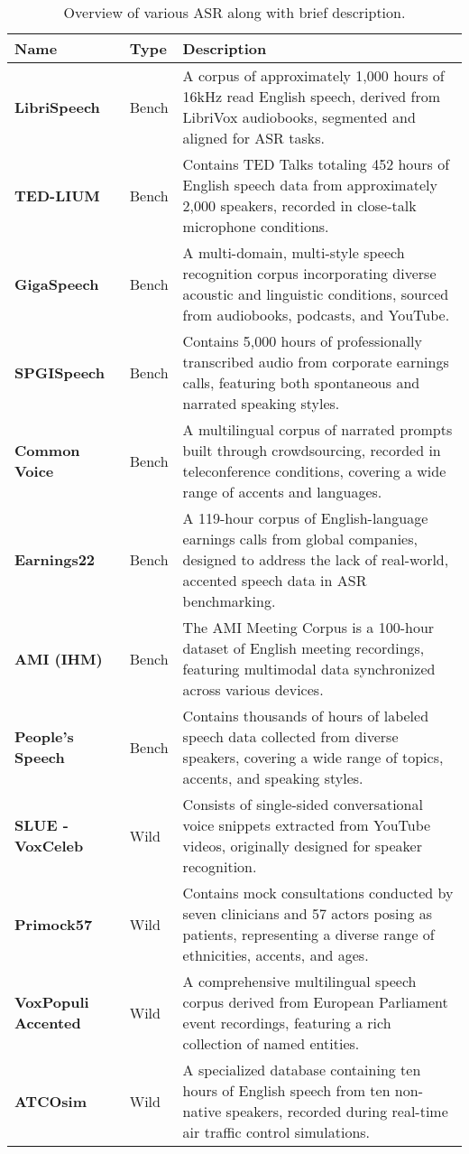 \begin{table*}[h!]
\centering
\begin{tabular}{p{4cm}p{2cm}p{8cm}}
\toprule
\textbf{Name} & \textbf{Type} & \textbf{Description} \\ \midrule
\textbf{LibriSpeech} & Bench & A corpus of approximately 1,000 hours of 16kHz read English speech, derived from LibriVox audiobooks, segmented and aligned for ASR tasks. \\
\textbf{TED-LIUM} & Bench & Contains TED Talks totaling 452 hours of English speech data from approximately 2,000 speakers, recorded in close-talk microphone conditions. \\
\textbf{GigaSpeech} & Bench & A multi-domain, multi-style speech recognition corpus incorporating diverse acoustic and linguistic conditions, sourced from audiobooks, podcasts, and YouTube. \\
\textbf{SPGISpeech} & Bench & Contains 5,000 hours of professionally transcribed audio from corporate earnings calls, featuring both spontaneous and narrated speaking styles. \\
\textbf{Common Voice} & Bench & A multilingual corpus of narrated prompts built through crowdsourcing, recorded in teleconference conditions, covering a wide range of accents and languages. \\
\textbf{Earnings22} & Bench & A 119-hour corpus of English-language earnings calls from global companies, designed to address the lack of real-world, accented speech data in ASR benchmarking. \\
\textbf{AMI (IHM)} & Bench & The AMI Meeting Corpus is a 100-hour dataset of English meeting recordings, featuring multimodal data synchronized across various devices. \\
\textbf{People's Speech} & Bench & Contains thousands of hours of labeled speech data collected from diverse speakers, covering a wide range of topics, accents, and speaking styles. \\
\textbf{SLUE - VoxCeleb} & Wild & Consists of single-sided conversational voice snippets extracted from YouTube videos, originally designed for speaker recognition. \\
\textbf{Primock57} & Wild & Contains mock consultations conducted by seven clinicians and 57 actors posing as patients, representing a diverse range of ethnicities, accents, and ages. \\
\textbf{VoxPopuli Accented} & Wild & A comprehensive multilingual speech corpus derived from European Parliament event recordings, featuring a rich collection of named entities. \\
\textbf{ATCOsim} & Wild & A specialized database containing ten hours of English speech from ten non-native speakers, recorded during real-time air traffic control simulations. \\ \bottomrule
\end{tabular}
\caption{Overview of various ASR along with brief description.}
\label{tab:list_of_datasets}
\end{table*}
